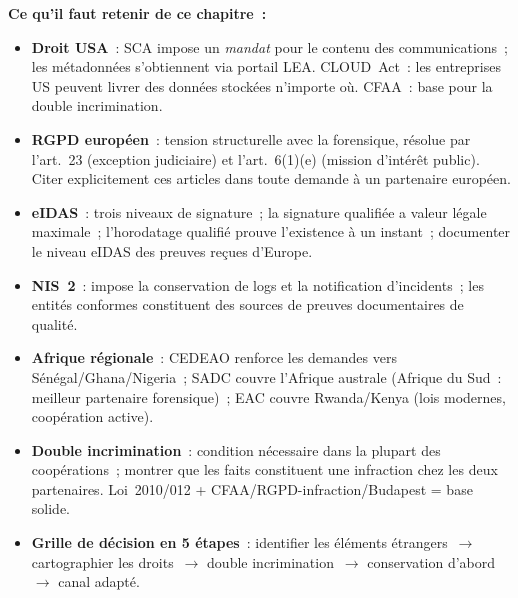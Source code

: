 \begin{boxresume}
\textbf{Ce qu'il faut retenir de ce chapitre~:}
\begin{itemize}
    \item \textbf{Droit USA}~: SCA impose un \emph{mandat} pour le contenu
          des communications~; les métadonnées s'obtiennent via portail LEA.
          CLOUD~Act~: les entreprises US peuvent livrer des données stockées
          n'importe où. CFAA~: base pour la double incrimination.

    \item \textbf{RGPD européen}~: tension structurelle avec la forensique,
          résolue par l'art.~23 (exception judiciaire) et l'art.~6(1)(e)
          (mission d'intérêt public). Citer explicitement ces articles
          dans toute demande à un partenaire européen.

    \item \textbf{eIDAS}~: trois niveaux de signature~; la signature
          qualifiée a valeur légale maximale~; l'horodatage qualifié
          prouve l'existence à un instant~; documenter le niveau eIDAS
          des preuves reçues d'Europe.

    \item \textbf{NIS~2}~: impose la conservation de logs et la
          notification d'incidents~; les entités conformes constituent
          des sources de preuves documentaires de qualité.

    \item \textbf{Afrique régionale}~: CEDEAO renforce les demandes vers
          Sénégal/Ghana/Nigeria~; SADC couvre l'Afrique australe (Afrique
          du Sud~: meilleur partenaire forensique)~; EAC couvre
          Rwanda/Kenya (lois modernes, coopération active).

    \item \textbf{Double incrimination}~: condition nécessaire dans la
          plupart des coopérations~; montrer que les faits constituent une
          infraction chez les deux partenaires. Loi~2010/012 +
          CFAA/RGPD-infraction/Budapest = base solide.

    \item \textbf{Grille de décision en 5 étapes}~: identifier les
          éléments étrangers~$\to$ cartographier les droits~$\to$ double
          incrimination~$\to$ conservation d'abord~$\to$ canal adapté.
\end{itemize}
\end{boxresume}

\bigskip

